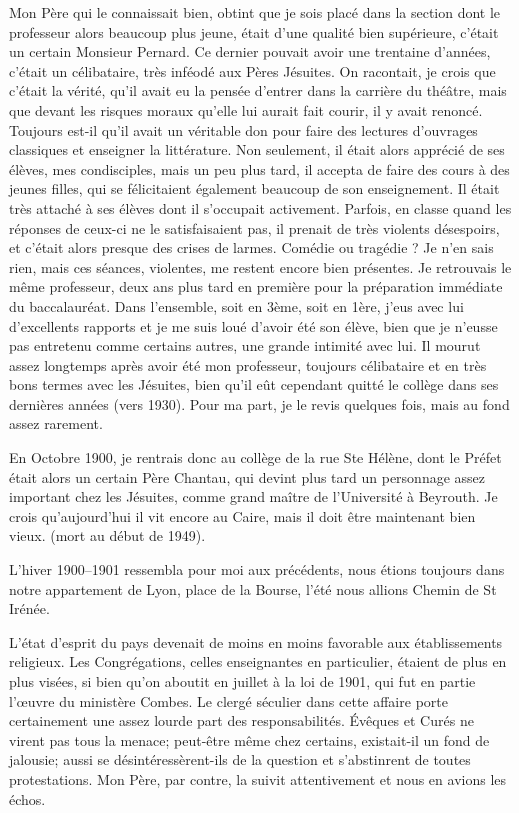 \documentclass[11pt,a4paper]{report}
\begin{document}
Mon Père qui le connaissait bien, obtint que je sois placé dans la section dont le professeur alors beaucoup plus jeune, était d'une qualité bien supérieure, c'était un certain Monsieur Pernard. Ce dernier pouvait avoir une trentaine d'années, c'était un célibataire, très inféodé aux Pères Jésuites. On racontait, je crois que c'était la vérité, qu'il avait eu la pensée d'entrer dans la carrière du théâtre, mais que devant les risques moraux qu'elle lui aurait fait courir, il y avait renoncé. Toujours est-il qu'il avait un véritable don pour faire des lectures d'ouvrages classiques et enseigner la littérature. Non seulement, il était alors apprécié de ses élèves, mes condisciples, mais un peu plus tard, il accepta de faire des cours à des jeunes filles, qui se félicitaient également beaucoup de son enseignement. Il était très attaché à ses élèves dont il s'occupait activement. Parfois, en classe quand les réponses de ceux-ci ne le satisfaisaient pas, il prenait de très violents désespoirs, et c'était alors presque des crises de larmes. Comédie ou tragédie ? Je n'en sais rien, mais ces séances, violentes, me restent encore bien présentes. Je retrouvais le même professeur, deux ans plus tard en première pour la préparation immédiate du baccalauréat. Dans l'ensemble, soit en 3ème, soit en 1ère, j'eus avec lui d'excellents rapports et je me suis loué d'avoir été son élève, bien que je n'eusse pas entretenu comme certains autres, une grande intimité avec lui. Il mourut assez longtemps après avoir été mon professeur, toujours célibataire et en très bons termes avec les Jésuites, bien qu'il eût cependant quitté le collège dans ses dernières années (vers 1930). Pour ma part, je le revis quelques fois, mais au fond assez rarement.

En Octobre 1900, je rentrais donc au collège de la rue Ste Hélène, dont le Préfet était alors un certain Père Chantau, qui devint plus tard un personnage assez important chez les Jésuites, comme grand maître de l'Université à Beyrouth. Je crois qu'aujourd'hui il vit encore au Caire, mais il doit être maintenant bien vieux. (mort au début de 1949).

L'hiver 1900--1901 ressembla pour moi aux précédents, nous étions toujours dans notre appartement de Lyon, place de la Bourse, l'été nous allions Chemin de St Irénée.

L'état d'esprit du pays devenait de moins en moins favorable aux établissements religieux. Les Congrégations, celles enseignantes en particulier, étaient de plus en plus visées, si bien qu'on aboutit en juillet à la loi de 1901, qui fut en partie l'œuvre du ministère Combes. Le clergé séculier dans cette affaire porte certainement une assez lourde part des responsabilités. Évêques et Curés ne virent pas tous la menace; peut-être même chez certains, existait-il un fond de jalousie; aussi se désintéressèrent-ils de la question et s'abstinrent de toutes protestations. Mon Père, par contre, la suivit attentivement et nous en avions les échos.
\end{document}
